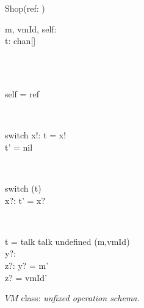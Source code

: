 \begin{figure}[H]
\centering
\begin{class}{Shop(ref: \integer)}
\\
\begin{state}
m, vmId, self: \integer
\\t: chan[\integer \times \integer]
\end{state} 
\\
\begin{init}
\\self = ref
\end{init} 
\\
\begin{op}{switch}
x!: \integer
\ST
t = x!
\\t' = nil
\end{op}
\\
\begin{op}{switch}
\Delta (t)
\\x?: \integer
\ST
t' = x?
\end{op}
\\
\begin{op}{ t = talk  talk  undefined}
\Delta (m,vmId)
\\y?: \integer
\\z?: \integer
\ST
y? = m'
\\z? = vmId'
\end{op}
\end{class}
\caption{$VM$ class: \textit{unfixed operation schema.}}
\label{fig_oz_unfixed_operation_schema_shop}
\end{figure}